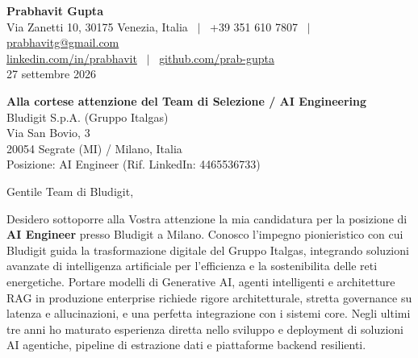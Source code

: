 \documentclass[10.5pt,a4paper]{article}
\begin{document}
\textbf{\large Prabhavit Gupta}\\
Via Zanetti 10, 30175 Venezia, Italia ~$\vert$~ +39 351 610 7807 ~$\vert$~ \href{mailto:prabhavitg@gmail.com}{prabhavitg@gmail.com}\\
\href{https://www.linkedin.com/in/prabhavit/}{linkedin.com/in/prabhavit} ~$\vert$~ \href{https://github.com/prab-gupta}{github.com/prab-gupta}\\
27 settembre 2026

\textbf{Alla cortese attenzione del Team di Selezione / AI Engineering}\\
Bludigit S.p.A. (Gruppo Italgas)\\
Via San Bovio, 3\\
20054 Segrate (MI) / Milano, Italia\\
Posizione: AI Engineer (Rif. LinkedIn: 4465536733)

Gentile Team di Bludigit,

Desidero sottoporre alla Vostra attenzione la mia candidatura per la posizione di \textbf{AI Engineer} presso Bludigit a Milano. Conosco l'impegno pionieristico con cui Bludigit guida la trasformazione digitale del Gruppo Italgas, integrando soluzioni avanzate di intelligenza artificiale per l'efficienza e la sostenibilita delle reti energetiche. Portare modelli di Generative AI, agenti intelligenti e architetture RAG in produzione enterprise richiede rigore architetturale, stretta governance su latenza e allucinazioni, e una perfetta integrazione con i sistemi core. Negli ultimi tre anni ho maturato esperienza diretta nello sviluppo e deployment di soluzioni AI agentiche, pipeline di estrazione dati e piattaforme backend resilienti.
\end{document}

